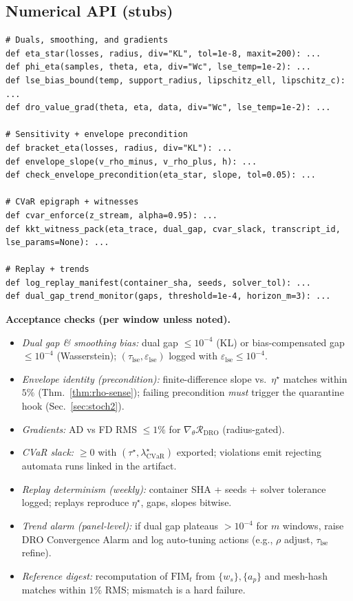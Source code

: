 \documentclass[10pt]{article}
\newcommand{\FIM}{\mathrm{FIM}}
\begin{document}
\subsection*{Numerical API (stubs)}
\begin{lstlisting}
# Duals, smoothing, and gradients
def eta_star(losses, radius, div="KL", tol=1e-8, maxit=200): ...
def phi_eta(samples, theta, eta, div="Wc", lse_temp=1e-2): ...
def lse_bias_bound(temp, support_radius, lipschitz_ell, lipschitz_c): ...
def dro_value_grad(theta, eta, data, div="Wc", lse_temp=1e-2): ...

# Sensitivity + envelope precondition
def bracket_eta(losses, radius, div="KL"): ...
def envelope_slope(v_rho_minus, v_rho_plus, h): ...
def check_envelope_precondition(eta_star, slope, tol=0.05): ...

# CVaR epigraph + witnesses
def cvar_enforce(z_stream, alpha=0.95): ...
def kkt_witness_pack(eta_trace, dual_gap, cvar_slack, transcript_id, lse_params=None): ...

# Replay + trends
def log_replay_manifest(container_sha, seeds, solver_tol): ...
def dual_gap_trend_monitor(gaps, threshold=1e-4, horizon_m=3): ...
\end{lstlisting}

\begin{mdframed}
\textbf{Acceptance checks (per window unless noted).}
\begin{itemize}[leftmargin=*]
\item \emph{Dual gap \& smoothing bias:} dual gap $\le 10^{-4}$ (KL) or bias-compensated gap $\le 10^{-4}$ (Wasserstein); $(\tau_{\mathrm{lse}},\varepsilon_{\mathrm{lse}})$ logged with $\varepsilon_{\mathrm{lse}}\le 10^{-4}$.
\item \emph{Envelope identity (precondition):} finite-difference slope vs.\ $\eta^\star$ matches within $5\%$ (Thm.~\ref{thm:rho-sense}); failing precondition \emph{must} trigger the quarantine hook (Sec.~\ref{sec:stoch2}).
\item \emph{Gradients:} AD vs FD RMS $\le 1\%$ for $\nabla_\theta \mathcal R_{\mathrm{DRO}}$ (radius-gated).
\item \emph{CVaR slack:} $\ge 0$ with $(\tau^\star,\lambda_{\mathrm{CVaR}}^\star)$ exported; violations emit rejecting automata runs linked in the artifact.
\item \emph{Replay determinism (weekly):} container SHA + seeds + solver tolerance logged; replays reproduce $\eta^\star$, gaps, slopes bitwise.
\item \emph{Trend alarm (panel-level):} if dual gap plateaus $>10^{-4}$ for $m$ windows, raise \textsf{DRO Convergence Alarm} and log auto-tuning actions (e.g., $\rho$ adjust, $\tau_{\mathrm{lse}}$ refine).
\item \emph{Reference digest:} recomputation of $\FIM_t$ from $\{w_s\},\{a_p\}$ and mesh-hash matches within $1\%$ RMS; mismatch is a hard failure.
\end{itemize}
\end{mdframed}
\end{document}
